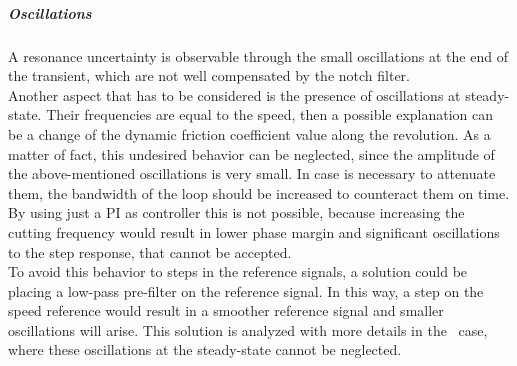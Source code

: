 \subparagraph{Oscillations}
A resonance uncertainty is observable through the small oscillations at the end of the transient, which are not well compensated by the notch filter. \\
Another aspect that has to be considered is the presence of oscillations at steady-state. Their frequencies are equal to the speed, then a possible explanation can be a change of the dynamic friction coefficient value along the revolution. As a matter of fact, this undesired behavior can be neglected, since the amplitude of the above-mentioned oscillations is very small. In case is necessary to attenuate them, the bandwidth of the loop should be increased to counteract them on time. By using just a PI as controller this is not possible, because increasing the cutting frequency would result in lower phase margin and significant oscillations to the step response, that cannot be accepted. \\
To avoid this behavior to steps in the reference signals, a solution could be placing a low-pass pre-filter on the reference signal. In this way, a step on the speed reference would result in a smoother reference signal and smaller oscillations will arise. This solution is analyzed with more details in the \twodof\ case, where these oscillations at the steady-state cannot be neglected.


